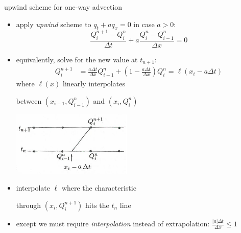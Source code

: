 \documentclass[10pt,hyperref,dvipsnames]{beamer}
\newcommand{\ds}{\displaystyle}
\begin{document}
\begin{frame}{upwind scheme for one-way advection}

\begin{itemize}
\item apply \emph{upwind} scheme to $q_t + aq_x=0$ in case $a>0$:
    $$\frac{Q_i^{n+1} - Q_i^n}{\Delta t} + a \frac{Q_i^n - Q_{i-1}^n}{\Delta x} = 0$$
\item equivalently, solve for the new value at $t_{n+1}$:
\begin{align*}
Q_i^{n+1} &= \frac{a\Delta t}{\Delta x} Q_{i-1}^n + \left(1 - \frac{a\Delta t}{\Delta x}\right) Q_i^n = \ell(x_i-a\Delta t)
\end{align*}
where $\ell(x)$ linearly interpolates

\noindent between $(x_{i-1},Q_{i-1}^n)$ and $(x_i,Q_i^n)$

\vspace{-9mm}
\hfill \includegraphics[width=0.45\textwidth]{figs/leveque4p4a}

\vspace{-7mm}
\item interpolate $\ell$ where the characteristic

\noindent through $(x_i,Q_i^{n+1})$ hits the $t_n$ line

\item except we must require \emph{interpolation} instead of extrapolation: $\ds \frac{|a|\Delta t}{\Delta x} \le 1$
\end{itemize}
\end{frame}
\end{document}
